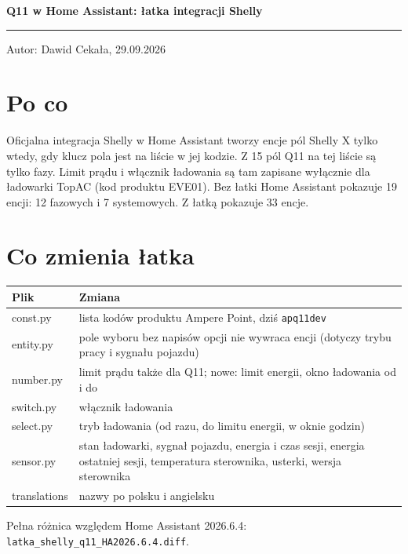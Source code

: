 \documentclass[11pt,a4paper]{article}
\begin{document}
{\LARGE\bfseries Q11 w Home Assistant: łatka integracji Shelly\par}
\vspace{4pt}\textcolor{apteal}{\rule{\textwidth}{1.2pt}}

Autor: Dawid Cekała, 29.09.2026


\section*{Po co}

Oficjalna integracja Shelly w Home Assistant tworzy encje pól Shelly X tylko wtedy, gdy klucz pola jest na liście w jej kodzie. Z 15 pól Q11 na tej liście są tylko fazy. Limit prądu i włącznik ładowania są tam zapisane wyłącznie dla ładowarki TopAC (kod produktu EVE01). Bez łatki Home Assistant pokazuje 19 encji: 12 fazowych i 7 systemowych. Z łatką pokazuje 33 encje.


\section*{Co zmienia łatka}

\begin{longtable}{>{\raggedright\arraybackslash}p{2.35cm}>{\raggedright\arraybackslash}p{13.37cm}}
\toprule
\rowcolor{apteallight}\textbf{Plik} & \textbf{Zmiana} \\
\midrule\endhead
\bottomrule\endfoot
const.py & lista kodów produktu Ampere Point, dziś \texttt{apq11dev} \\
entity.py & pole wyboru bez napisów opcji nie wywraca encji (dotyczy trybu pracy i sygnału pojazdu) \\
number.py & limit prądu także dla Q11; nowe: limit energii, okno ładowania od i do \\
switch.py & włącznik ładowania \\
select.py & tryb ładowania (od razu, do limitu energii, w oknie godzin) \\
sensor.py & stan ładowarki, sygnał pojazdu, energia i czas sesji, energia ostatniej sesji, temperatura sterownika, usterki, wersja sterownika \\
translations & nazwy po polsku i angielsku \\
\end{longtable}

Pełna różnica względem Home Assistant 2026.6.4: \texttt{latka\_\allowbreak{}shelly\_\allowbreak{}q11\_\allowbreak{}HA2026.\allowbreak{}6.\allowbreak{}4.\allowbreak{}diff}.
\end{document}
